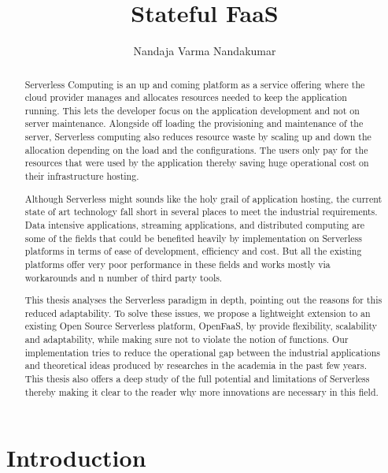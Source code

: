 \documentclass[12pt,titlepage]{article}
\author{Nandaja Varma Nandakumar}
\date{}
\title{Stateful FaaS}
\begin{document}
\maketitle
\begin{abstract}
Serverless Computing is an up and coming platform as a service offering 
where the cloud provider manages and allocates
resources needed to keep the application running. This lets the developer focus on the application development
and not on server maintenance. Alongside off loading the provisioning and
maintenance of the server, Serverless computing also reduces resource waste
by scaling up and down the allocation depending on the load and the
configurations. The users only pay for the resources that were used by the
application thereby saving huge operational cost on their infrastructure
hosting.

Although Serverless might sounds like the holy grail of application hosting, the 
current state of art technology fall short in several places to meet the industrial
requirements. Data intensive applications, streaming applications, and
distributed computing are some of the fields that could be benefited heavily by
implementation on Serverless platforms in terms of ease of development,
efficiency and cost. But all the existing platforms offer very
poor performance in these fields and works mostly via workarounds and n number
of third party tools.

This thesis analyses the Serverless paradigm in depth,
pointing out the reasons for this reduced adaptability. To solve these issues, we propose a lightweight
extension to an existing Open Source Serverless platform, OpenFaaS, by provide
flexibility, scalability and adaptability, while making sure not to violate the notion
of functions. Our implementation tries to reduce the operational gap between the
industrial applications and theoretical ideas produced by researches in the
academia in the past few years.
This thesis also offers a deep study of the full potential and limitations of
Serverless thereby making it clear to the reader why more innovations are
necessary in this field.

\end{abstract}

\setcounter{tocdepth}{4}
\tableofcontents


\section{Introduction}
\label{sec:org9a1194d}
\end{document}
